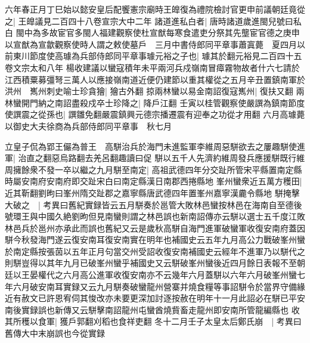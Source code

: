 六年春正月丁巳始以懿安皇后配饗憲宗廟時王皥復為禮院檢討官更申前議朝廷竟從之|{
	王皥議見二百四十八卷宣宗大中二年}
諸道進私白者|{
	唐時諸道歲進閩兒號曰私白}
閩中為多故宦官多閩人福建觀察使杜宣猷每寒食遣吏分祭其先壟宦官德之庚申以宣猷為宣歙觀察使時人謂之敕使墓戶　三月中書侍郎同平章事蕭寘薨　夏四月以前東川節度使高璩為兵部侍郎同平章事璩元裕之子也|{
	璩其於翻元裕見二百四十五卷文宗太和八年}
楊收建議以蠻寇積年未平兩河兵戍嶺南冒瘴霧物故者什六七請於江西積粟募彊弩三萬人以應接嶺南道近便仍建節以重其權從之五月辛丑置鎮南軍於洪州　嶲州刺史喻士珍貪獪|{
	獪古外翻}
掠兩林蠻以易金南詔復寇嶲州|{
	復扶又翻}
兩林蠻開門納之南詔盡殺戍卒士珍降之|{
	降戶江翻}
壬寅以桂管觀察使嚴譔為鎮南節度使譔震之從孫也|{
	譔雛免翻嚴震鎮興元德宗播遷震有迎奉之功從才用翻}
六月高璩薨以御史大夫徐商為兵部侍郎同平章事　秋七月

立皇子侃為郢王儼為普王　高駢治兵於海門未進監軍李維周惡駢欲去之屢趣駢使進軍|{
	治直之翻惡烏路翻去羌呂翻趣讀曰促}
駢以五千人先濟約維周發兵應援駢既行維周擁餘衆不發一卒以繼之九月駢至南定|{
	高祖武德四年分交趾所管宋平縣置南定縣時屬安南府安南府即交趾宋白曰南定縣漢日南郡西捲縣地}
峯州蠻衆近五萬方穫田|{
	近其靳翻劉昫曰峯州隋交趾郡之嘉寧縣唐武德四年置峯州嘉寧漢麊令縣地}
駢掩擊大破之　|{
	考異曰舊紀實録皆云五月駢奏於邕管大敗林邑蠻按林邑在海南自至德後號環王與中國久絶劉昫但見南蠻則謂之林邑誤也新南詔傳亦云駢以選士五千度江敗林邑兵於邕州亦承此而誤也舊紀又云是歲秋高駢自海門進軍破蠻軍收復安南府蓋因駢今秋發海門遂云復安南耳復安南實在明年也補國史云五年九月高公力戰破峯州蠻於南定縣按張茵以五年正月句當交州受詔收復安南補國史云經年不進軍乃以駢代之則駢豈得以其年九月已破峯州蠻乎補國史又云駢破峯州蠻後近四月餘日表報不至朝廷以王晏權代之六月高公進軍收復安南亦不云幾年六月蓋駢以六年六月破峯州蠻七年六月破安南耳實録又云九月駢奏破蠻龍州營寨并燒食糧等事詔駢令於當界守備緣近有赦文已許恩宥伺其悛改亦未要更深加討逐按赦在明年十一月此詔必在駢已平安南後實録誤也新傳又云駢擊南詔龍州屯蠻酋燒貲畜走龍州即安南所管龍編縣也}
收其所穫以食軍|{
	獲戶郭翻刈稻也食祥吏翻}
冬十二月壬子太皇太后鄭氏崩　|{
	考異曰舊傳大中末崩誤也今從實録}


